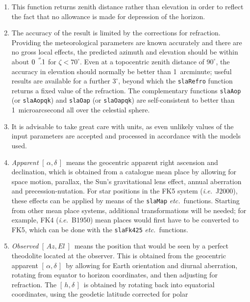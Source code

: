 \documentclass[11pt,fleqn,twoside]{article}
\renewcommand{\_}{{\tt\char'137}}     %
\newcommand{\radec}     {$[\,\alpha,\delta\,]$}
\newcommand{\hadec}     {$[\,h,\delta\,]$}
\newcommand{\azel}      {$[\,Az,El~]$}
\newcommand{\arcseci}[1] {$#1\hspace{0.05em}$\raisebox{-0.5ex}
                         {$^{'\hspace{-0.1em}'\hspace{0.0em}}$}}
\newcommand{\arcsec}[2] {\arcseci{#1}$\hspace{-0.35em}.#2$}
\begin{document}
{
 \begin{enumerate}
  \item This function returns zenith distance rather than elevation
        in order to reflect the fact that no allowance is made for
        depression of the horizon.
  \item The accuracy of the result is limited by the corrections for
        refraction.  Providing the meteorological parameters are
        known accurately and there are no gross local effects, the
        predicted azimuth and elevation should be within about
        \arcsec{0}{1} for $\zeta<70^{\circ}$.  Even
        at a topocentric zenith distance of
        $90^{\circ}$, the accuracy in elevation
        should normally be better than
        1~arcminute;  useful results are available for a further
        $3^{\circ}$, beyond which the {\tt slaRefro} function returns a
        fixed value of the refraction.  The complementary
        functions {\tt slaAop} (or {\tt slaAopqk}) and {\tt slaOap} (or {\tt slaOapqk})
        are self-consistent to better than 1~microarcsecond all over
        the celestial sphere.
  \item It is advisable to take great care with units, as even
        unlikely values of the input parameters are accepted and
        processed in accordance with the models used.
  \item {\it Apparent}\/ \radec\ means the geocentric apparent right ascension
        and declination, which is obtained from a catalogue mean place
        by allowing for space motion, parallax, the Sun's gravitational
        lens effect, annual aberration and precession-nutation.  For
        star positions in the FK5 system ({\it i.e.}~J2000), these effects can
        be applied by means of the {\tt slaMap} {\it etc.}\ functions.  Starting from
        other mean place systems, additional transformations will be
        needed;  for example, FK4 ({\it i.e.}~B1950) mean places would first
        have to be converted to FK5, which can be done with the
        {\tt slaFk425} {\it etc.}\ functions.
  \item {\it Observed}\/ \azel\ means the position that would be seen by a
        perfect theodolite located at the observer.  This is obtained
        from the geocentric apparent \radec\ by allowing for Earth
        orientation and diurnal aberration, rotating from equator
        to horizon coordinates, and then adjusting for refraction.
        The \hadec\ is obtained by rotating back into equatorial
        coordinates, using the geodetic latitude corrected for polar

\end{enumerate}}
\end{document}
